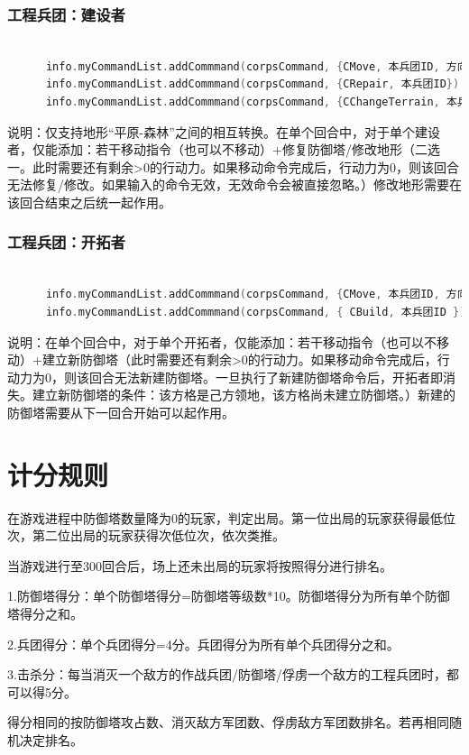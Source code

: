 \documentclass[a4paper,4pt]{article}
\begin{document}
\subsubsection{工程兵团：建设者}
\begin{lstlisting}[language={C++}]  %插入代码块
          
      info.myCommandList.addCommmand(corpsCommand, {CMove, 本兵团ID, 方向(Cup / Cdown / Cleft / Cright)})  //移动
      info.myCommandList.addCommmand(corpsCommand, {CRepair, 本兵团ID})  //修复防御塔
      info.myCommandList.addCommmand(corpsCommand, {CChangeTerrain, 本兵团ID, 目标地形(枚举类型)})  //修改地形
\end{lstlisting}
说明：仅支持地形“平原-森林”之间的相互转换。在单个回合中，对于单个建设者，仅能添加：若干移动指令（也可以不移动）+修复防御塔/修改地形（二选一。此时需要还有剩余>0的行动力。如果移动命令完成后，行动力为0，则该回合无法修复/修改。如果输入的命令无效，无效命令会被直接忽略。）修改地形需要在该回合结束之后统一起作用。

\subsubsection{工程兵团：开拓者}
\begin{lstlisting}[language={C++}]  %插入代码块
          
      info.myCommandList.addCommmand(corpsCommand, {CMove, 本兵团ID, 方向(Cup / Cdown / Cleft / Cright)})  //移动
      info.myCommandList.addCommmand(corpsCommand, { CBuild, 本兵团ID })  //建立新防御塔
\end{lstlisting}
说明：在单个回合中，对于单个开拓者，仅能添加：若干移动指令（也可以不移动）+建立新防御塔（此时需要还有剩余>0的行动力。如果移动命令完成后，行动力为0，则该回合无法新建防御塔。一旦执行了新建防御塔命令后，开拓者即消失。建立新防御塔的条件：该方格是己方领地，该方格尚未建立防御塔。）新建的防御塔需要从下一回合开始可以起作用。

\section{计分规则}
在游戏进程中防御塔数量降为0的玩家，判定出局。第一位出局的玩家获得最低位次，第二位出局的玩家获得次低位次，依次类推。\par
当游戏进行至300回合后，场上还未出局的玩家将按照得分进行排名。\par
1.防御塔得分：单个防御塔得分=防御塔等级数*10。防御塔得分为所有单个防御塔得分之和。\par
2.兵团得分：单个兵团得分=4分。兵团得分为所有单个兵团得分之和。\par
3.击杀分：每当消灭一个敌方的作战兵团/防御塔/俘虏一个敌方的工程兵团时，都可以得5分。\par
得分相同的按防御塔攻占数、消灭敌方军团数、俘虏敌方军团数排名。若再相同随机决定排名。\par
\end{document}
